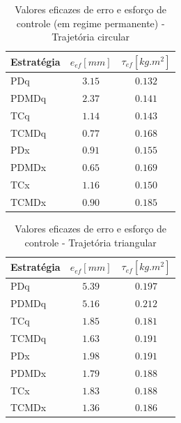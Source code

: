 \documentclass[]{politex}
\begin{document}
\begin{table}[H] 
\centering
\caption{Valores eficazes de erro e esforço de controle (em regime permanente) - Trajetória circular}
\label{tab:valoresEficazesCirculo}
\begin{tabular}{l|c|c}
Estratégia & $e_{ef} [mm]$  & $\tau_{ef} [kg.m^2] $ \\ \hline
PDq        & $3.15$         & $0.132$               \\
PDMDq      & $2.37$         & $0.141$               \\
TCq        & $1.14$         & $0.143$               \\
TCMDq      & $0.77$         & $0.168$               \\
PDx        & $0.91$         & $0.155$               \\
PDMDx      & $0.65$         & $0.169$               \\
TCx        & $1.16$         & $0.150$               \\
TCMDx      & $0.90$         & $0.185$               \\
\end{tabular}
\end{table}

\begin{table}[H] 
\centering
\caption{Valores eficazes de erro e esforço de controle - Trajetória triangular}
\label{tab:valoresEficazesTriangulo}
\begin{tabular}{l|c|c}
Estratégia & $e_{ef} [mm]$  & $\tau_{ef} [kg.m^2] $ \\ \hline
PDq        & $5.39$         & $0.197$               \\
PDMDq      & $5.16$         & $0.212$               \\
TCq        & $1.85$         & $0.181$               \\
TCMDq      & $1.63$         & $0.191$               \\
PDx        & $1.98$         & $0.191$               \\
PDMDx      & $1.79$         & $0.188$               \\
TCx        & $1.83$         & $0.188$               \\
TCMDx      & $1.36$         & $0.186$               \\
\end{tabular}
\end{table}
\end{document}

